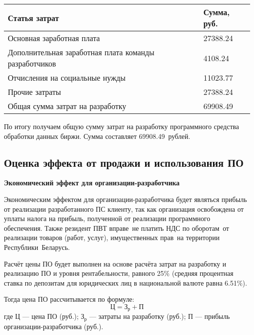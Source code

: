 \begin{small}
\begin{tabularx}{\textwidth}{|X|p{}|}
    \caption{Затраты на разработку программного обеспечения}\label{table:spent}\\
    \hline
    Статья затрат & Сумма, руб. \\
    \hline
    Основная заработная плата & 27388.24 \\
    \hline
    Дополнительная заработная плата команды разработчиков & 4108.24 \\
    \hline
    Отчисления на социальные нужды & 11023.77 \\
    \hline
    Прочие затраты & 27388.24 \\
    \hline
    Общая сумма затрат на разработку & 69908.49 \\
    \hline
\end{tabularx}
\end{small}

По итогу получаем общую сумму затрат на разработку программного средства обработки данных биржи. Сумма составляет 69908.49~рублей.

\subsection{Оценка эффекта от продажи и использования ПО}

\textbf{Экономический эффект для организации-разработчика}

Экономическим эффектом для организации-разработчика будет являться прибыль от реализации разработанного ПС клиенту, так как организация освобождена от уплаты налога на прибыль, полученной от реализации программного обеспечения. Также резидент ПВТ вправе не платить НДС по оборотам от реализации товаров (работ, услуг), имущественных прав на территории Республики Беларусь.

Расчёт цены ПО будет выполнен на основе расчёта затрат на разработку и реализацию ПО и уровня рентабельности, равного 25\% (средняя процентная ставка по депозитам для юридических лиц в национальной валюте равна 6.51\%).

Тогда цена ПО рассчитывается по формуле:
\begin{equation}
    \textit{Ц} = \textit{З}_\textit{р} + \textit{П}
\end{equation}
где $\textit{Ц}$ — цена ПО (руб.); $\textit{З}_\textit{р}$ — затраты на разработку (руб.); $\textit{П}$ — прибыль организации-разработчика (руб.).


